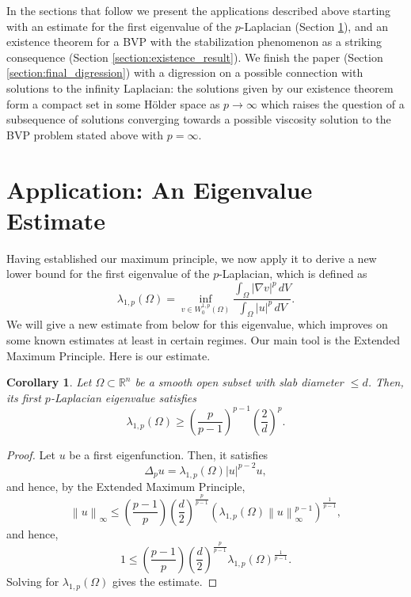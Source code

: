 \documentclass[11pt]{amsart}
\newtheorem{corollary}[theorem]{Corollary}
\theoremstyle{definition}
\begin{document}
In the sections that follow we present the applications
described above starting with an estimate for
the first eigenvalue of the $p$-Laplacian (Section \ref{section:eigenvalue_estimate}),
and an existence theorem for a BVP with the stabilization
phenomenon as a striking consequence (Section \ref{section:existence_result}). We finish
the paper (Section \ref{section:final_digression})
with a digression on a possible connection with solutions to the infinity Laplacian:
the solutions given by our existence theorem form a compact set in some H\"older space
as $p\rightarrow \infty$ which raises the question of a subsequence of solutions converging 
towards a possible viscosity solution to the BVP problem stated above with $p=\infty$.

\section{Application: An Eigenvalue Estimate}
\label{section:eigenvalue_estimate}

Having established our maximum principle, we now apply it to derive a new lower bound for the first eigenvalue of the $p$-Laplacian, which 
is defined as 
\[
\lambda_{1,p}\left(\Omega\right)
=\inf_{v\in W_0^{1,p}\left(\Omega\right)}
\frac{\int_{\Omega}\left|\nabla v\right|^p\, dV}{\int_{\Omega}
\left|u\right|^p \,dV}.
\]
We will give a new estimate from below for this eigenvalue, 
which improves on some known estimates at least in certain regimes.
Our main tool
is the Extended Maximum Principle. Here is our estimate.
\begin{corollary}
    Let $\Omega\subset \mathbb{R}^n$ be a smooth open subset with slab diameter $\leq d$.
    Then, its first $p$-Laplacian eigenvalue satisfies
    \[
    \lambda_{1,p}\left(\Omega\right)\geq \left(\frac{p}{p-1}\right)^{p-1}\left(\frac{2}{d}\right)^{p}. 
    \]
\end{corollary}
\begin{proof}
    Let $u$ be a first eigenfunction. Then, it satisfies
    \[
    \Delta_p u = \lambda_{1,p}\left(\Omega\right)\left|u\right|^{p-2}u,
    \]
    and hence, by the Extended Maximum Principle,
    \[
    \left\|u\right\|_{\infty}\leq \left(\frac{p-1}{p}\right)
\left(\frac{d}{2}\right)^{\frac{p}{p-1}} 
\left(\lambda_{1,p}\left(\Omega\right)\left\|u\right\|_{\infty}^{p-1}\right)^{\frac{1}{p-1}},
    \]
    and hence,
    \[
    1\leq \left(\frac{p-1}{p}\right)
\left(\frac{d}{2}\right)^{\frac{p}{p-1}}\lambda_{1,p}\left(\Omega\right)^{\frac{1}{p-1}}.
    \]
    Solving for $\lambda_{1,p}\left(\Omega\right)$ gives the estimate.
\end{proof}
\end{document}
